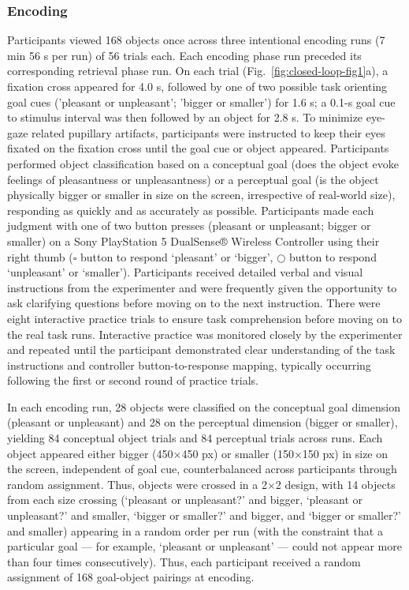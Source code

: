 \subsubsection{Encoding}

Participants viewed 168 objects once across three intentional encoding runs (7 min 56 s per run) of 56 trials each. Each encoding phase run preceded its corresponding retrieval phase run. On each trial (Fig.~\ref{fig:closed-loop-fig1}a), a fixation cross appeared for 4.0 s, followed by one of two possible task orienting goal cues ('pleasant or unpleasant'; 'bigger or smaller') for 1.6 s; a 0.1-s goal cue to stimulus interval was then followed by an object for 2.8 s. To minimize eye-gaze related pupillary artifacts, participants were instructed to keep their eyes fixated on the fixation cross until the goal cue or object appeared. Participants performed object classification based on a conceptual goal (does the object evoke feelings of pleasantness or unpleasantness) or a perceptual goal (is the object physically bigger or smaller in size on the screen, irrespective of real-world size), responding as quickly and as accurately as possible. Participants made each judgment with one of two button presses (pleasant or unpleasant; bigger or smaller) on a Sony PlayStation 5 DualSense® Wireless Controller using their right thumb ($\square$ button to respond `pleasant' or `bigger', $\bigcirc$ button to respond `unpleasant' or `smaller'). Participants received detailed verbal and visual instructions from the experimenter and were frequently given the opportunity to ask clarifying questions before moving on to the next instruction. There were eight interactive practice trials to ensure task comprehension before moving on to the real task runs. Interactive practice was monitored closely by the experimenter and repeated until the participant demonstrated clear understanding of the task instructions and controller button-to-response mapping, typically occurring following the first or second round of practice trials.

In each encoding run, 28 objects were classified on the conceptual goal dimension (pleasant or unpleasant) and 28 on the perceptual dimension (bigger or smaller), yielding 84 conceptual object trials and 84 perceptual trials across runs. Each object appeared either bigger (450$\times$450 px) or smaller (150$\times$150 px) in size on the screen, independent of goal cue, counterbalanced across participants through random assignment. Thus, objects were crossed in a 2$\times$2 design, with 14 objects from each size crossing (`pleasant or unpleasant?' and bigger, `pleasant or unpleasant?' and smaller, `bigger or smaller?' and bigger, and `bigger or smaller?' and smaller) appearing in a random order per run (with the constraint that a particular goal –– for example, `pleasant or unpleasant' –– could not appear more than four times consecutively). Thus, each participant received a random assignment of 168 goal-object pairings at encoding.

